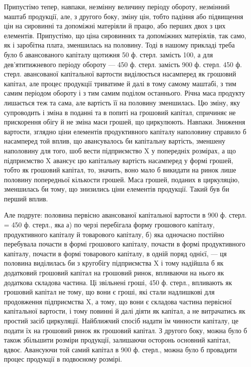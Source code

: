 \parcont{}  %
Припустімо тепер, навпаки, незмінну величину періоду обороту, незмінний
маштаб продукції, але, з другого боку, зміну цін, тобто падіння або
підвищення цін на сировинні та допоміжні матеріяли й працю, або перших
двох з цих елементів. Припустімо, що ціна сировинних та допоміжних
матеріялів, так само, як і заробітна плата, зменшилась на половину.
Тоді в нашому прикладі треба було б авансованого капіталу щотижня
50 ф. стерл. замість 100, а для дев'ятитижневого періоду обороту — 450 ф.
стерл. замість 900 ф. стерл. 450 ф. стерл. авансованої капітальної
вартости виділюється насамперед як грошовий капітал, але процес продукції
триватиме й далі в тому самому маштабі, з тим самим періодом
обороту і з тим самим поділом останнього. Річна маса продукту лишається
теж та сама, але вартість її на половину зменшилась. Цю зміну, яку
супроводить і зміна в поданні та в попиті на грошовий капітал, спричиняє
не прискорення обігу й не зміна маси грошей, що циркулюють. Навпаки.
Зниження вартости, зглядно ціни елементів продуктивного капіталу
наполовину справило б насамперед той вплив, що авансувалось би капітальну
вартість, зменшену наполовину для того, шоб вести підприємство
X у попередніх розмірах, а що підприємство X авансує цю капітальну
вартість насамперед у формі грошей, тобто як грошовий капітал,
то, значить, воно мало б викидати на ринок лише половину попередньої
кількости грошей. Маса грошей, поданих в циркуляцію, зменшилась би
тому, що знизились ціни елементів продукції. Такий був би перший вплив.

Але подруге: половина первісно авансованої капітальної вартости в
900 ф. стерл. = 450 ф. стерл., яка а) по черзі перебігала форму грошового
капіталу, продуктивного капіталу й товарового капіталу, б) яка одночасно
постійно перебувала почасти в формі грошового капіталу, почасти
в формі продуктивного капіталу, почасти в формі товарового капіталу,
в одній поряд однієї, — ця половина виділилась би з
кругобігу підприємства X і тому надійшла б як додатковий грошовий
капітал на грошовий ринок, впливаючи на нього як додаткова складова
частина. Ці звільнені гроші, 450 ф. стерл., впливають як грошовий капітал
не тому, що вони є гроші, які стали надлишкові для продовження
підприємства X, а тому, що вони є складова частина первісної капітальної
вартости, і тому повинні й далі діяти як капітал, а не витрачатись як
простий засіб циркуляції. Найближчий спосіб надати їм чинности капіталу,
це подати їх на грошовий ринок як грошовий капітал. З другого боку,
можна було б також збільшити розміри продукції, залишаючи осторонь
основний капітал, вдвоє. Авансуючи той самий капітал в 900 ф.
стерл., можна було б провадити процес продукції в подвоєному розмірі.

